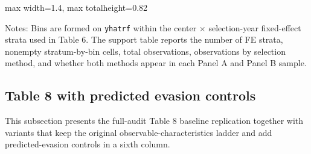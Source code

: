 \documentclass{article}
\newcommand{\OutPath}{Output/}%
\newcommand{\OutPath}{../Output/}%
\begin{document}
\begin{landscape}
\begin{table}[H]\centering
\begin{adjustbox}{max width=1.4\textwidth, max totalheight=0.82\textheight}
\begin{threeparttable}
\caption{Bin support for Table 6 predicted-evasion robustness specifications}
\label{tab:table6_indices_yhatrf_bin_support}

\scriptsize


\begin{tablenotes}[flushleft]
\scriptsize
\item Notes: Bins are formed on \texttt{yhatrf} within the center $\times$ selection-year fixed-effect strata used in Table 6. The support table reports the number of FE strata, nonempty stratum-by-bin cells, total observations, observations by selection method, and whether both methods appear in each Panel A and Panel B sample.
\end{tablenotes}
\end{threeparttable}
\end{adjustbox}
\end{table}
\end{landscape}

\subsection{Table 8 with predicted evasion controls}

This subsection presents the full-audit Table 8 baseline replication together with variants that keep the original observable-characteristics ladder and add predicted-evasion controls in a sixth column.
\end{document}
